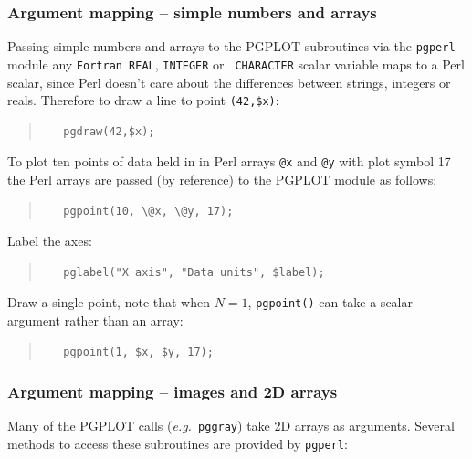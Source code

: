 \documentclass[twoside,11pt]{article}
\begin{document}
\subsubsection{Argument mapping -- simple numbers and arrays}

Passing simple numbers and arrays to the PGPLOT subroutines via the
{\tt pgperl} module any {\tt Fortran REAL}, {\tt INTEGER} or {\tt
CHARACTER} scalar variable maps to a Perl scalar, since Perl doesn't
care about the differences between strings, integers or reals.
Therefore to draw a line to point \verb+(42,$x)+:

\small
\begin{quote}
\begin{verbatim}
   pgdraw(42,$x);
\end{verbatim}
\end{quote}
\normalsize

To plot ten points of data held in in Perl arrays {\tt @x} and {\tt @y}
with plot symbol 17 the Perl arrays are passed (by reference) to the
PGPLOT module as follows:

\small
\begin{quote}
\begin{verbatim}
   pgpoint(10, \@x, \@y, 17);
\end{verbatim}
\end{quote}
\normalsize


Label the axes:

\small
\begin{quote}
\begin{verbatim}
   pglabel("X axis", "Data units", $label);
\end{verbatim}
\end{quote}
\normalsize

Draw a single point, note that when $N=1$, {\tt pgpoint()} can take a
scalar argument rather than an array:

\small
\begin{quote}
\begin{verbatim}
   pgpoint(1, $x, $y, 17);
\end{verbatim}
\end{quote}
\normalsize

\subsubsection{Argument mapping -- images and 2D arrays}

Many of the PGPLOT calls ({\em e.g.\ }{\tt pggray}) take 2D arrays as
arguments. Several methods to access these subroutines are provided by
{\tt pgperl}:
\end{document}
